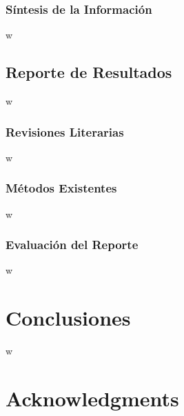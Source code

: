 \documentclass[•]{article}
\begin{document}
	\subsubsection{Síntesis de la Información}
    w

\subsection{Reporte de Resultados}
    w
    \subsubsection{Revisiones Literarias}
	w
	\subsubsection{Métodos Existentes}
	w
	\subsubsection{Evaluación del Reporte}
    w
	
\section{Conclusiones}
    w
\section*{Acknowledgments} %





\end{document}

